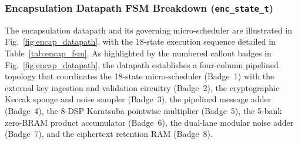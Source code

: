 \subsubsection{Encapsulation Datapath FSM Breakdown (\texttt{enc\_state\_t})}
The encapsulation datapath and its governing micro-scheduler are illustrated in Fig.~\ref{fig:encap_datapath}, with the 18-state execution sequence detailed in Table~\ref{tab:encap_fsm}. As highlighted by the numbered callout badges in Fig.~\ref{fig:encap_datapath}, the datapath establishes a four-column pipelined topology that coordinates the 18-state micro-scheduler (Badge~1) with the external key ingestion and validation circuitry (Badge~2), the cryptographic Keccak sponge and noise sampler (Badge~3), the pipelined message adder (Badge~4), the 8-DSP Karatsuba pointwise multiplier (Badge~5), the 5-bank zero-BRAM product accumulator (Badge~6), the dual-lane modular noise adder (Badge~7), and the ciphertext retention RAM (Badge~8).

